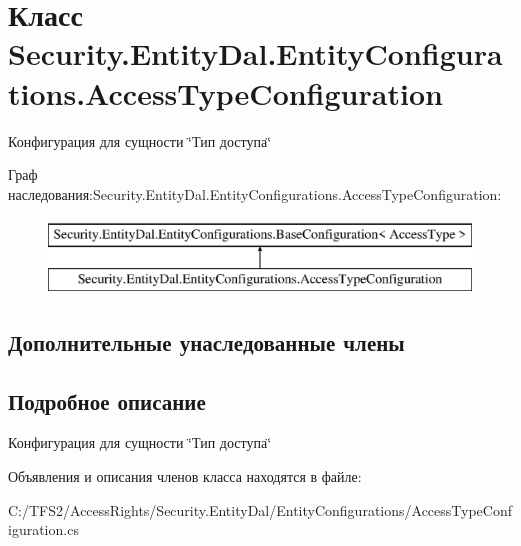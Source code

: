 \hypertarget{class_security_1_1_entity_dal_1_1_entity_configurations_1_1_access_type_configuration}{}\section{Класс Security.\+Entity\+Dal.\+Entity\+Configurations.\+Access\+Type\+Configuration}
\label{class_security_1_1_entity_dal_1_1_entity_configurations_1_1_access_type_configuration}


Конфигурация для сущности \char`\"{}Тип доступа\char`\"{}  


Граф наследования\+:Security.\+Entity\+Dal.\+Entity\+Configurations.\+Access\+Type\+Configuration\+:\begin{figure}[H]
\begin{center}
\leavevmode
\includegraphics[height=2.000000cm]{db/d96/class_security_1_1_entity_dal_1_1_entity_configurations_1_1_access_type_configuration}
\end{center}
\end{figure}
\subsection*{Дополнительные унаследованные члены}


\subsection{Подробное описание}
Конфигурация для сущности \char`\"{}Тип доступа\char`\"{} 



Объявления и описания членов класса находятся в файле\+:\begin{DoxyCompactItemize}
\item 
C\+:/\+T\+F\+S2/\+Access\+Rights/\+Security.\+Entity\+Dal/\+Entity\+Configurations/Access\+Type\+Configuration.\+cs\end{DoxyCompactItemize}
